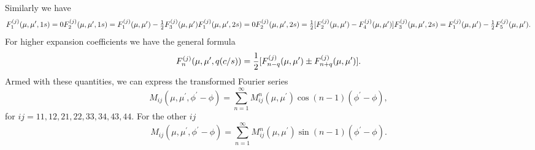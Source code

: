 \documentclass[12pt]{article}
\begin{document}
Similarly we have 
\begin{equation}
F_1^{(j)}(\mu,\mu^\prime,1s)=0
$$    $$
F_2^{(j)}(\mu,\mu^\prime,1s)=F_1^{(j)}(\mu,\mu^\prime)-{1 \over 2} F_3^{(j)}(\mu,\mu^\prime)
$$    $$
F_1^{(j)}(\mu,\mu^\prime,2s)=0
$$    $$
F_2^{(j)}(\mu,\mu^\prime,2s)={1 \over 2}\lbrack F_2^{(j)}(\mu,\mu^\prime)- F_4^{(j)}(\mu,\mu^\prime) \rbrack
$$    $$
F_3^{(j)}(\mu,\mu^\prime,2s)=F_1^{(j)}(\mu,\mu^\prime)-{1 \over 2} F_5^{(j)}(\mu,\mu^\prime).
\end{equation}
For higher expansion coefficients we have the general formula
\begin{equation}
F_n^{(j)}(\mu,\mu^\prime,q(c/s))={1 \over 2}\lbrack F_{n-q}^{(j)}(\mu,\mu^\prime)\pm F_{n+q}^{(j)}(\mu,\mu^\prime) \rbrack.
\end{equation}
Armed with these quantities, we can express the transformed Fourier series
\begin{equation}
M_{ij}(\mu,\mu^\prime,\phi^\prime-\phi)=\sum_{n=1}^\infty M_{ij}^n(\mu,\mu^\prime)
{\cos}(n-1)(\phi^\prime-\phi),
\end{equation}
for $ij=11, 12, 21, 22, 33, 34, 43, 44$. For the other $ij$
\begin{equation}
M_{ij}(\mu,\mu^\prime,\phi^\prime-\phi)=\sum_{n=1}^\infty M_{ij}^n(\mu,\mu^\prime)
{\sin}(n-1)(\phi^\prime-\phi).
\end{equation}
\end{document}
